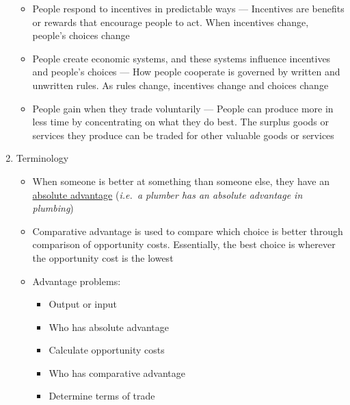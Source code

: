 \documentclass[12pt]{article}
\begin{document}
\begin{enumerate}
\begin{itemize}
      \item People respond to incentives in predictable ways — Incentives are benefits or rewards that encourage people to act. When incentives change, people's choices change

      \item People create economic systems, and these systems influence incentives and people's choices — How people cooperate is governed by written and unwritten rules. As rules change, incentives change and choices change

      \item People gain when they trade voluntarily — People can produce more in less time by concentrating on what they do best. The surplus goods or services they produce can be traded for other valuable goods or services

    \end{itemize}

  \item Terminology

    \begin{itemize}

      \item When someone is better at something than someone else, they have an \underline{absolute advantage} (\textit{i.e.\ a plumber has an absolute advantage in plumbing})

      \item Comparative advantage is used to compare which choice is better through comparison of opportunity costs. Essentially, the best choice is wherever the opportunity cost is the lowest

      \item Advantage problems:

        \begin{itemize}

          \item Output or input

          \item Who has absolute advantage

          \item Calculate opportunity costs

          \item Who has comparative advantage

          \item Determine terms of trade

        \end{itemize}


\end{itemize}
\end{enumerate}
\end{document}
